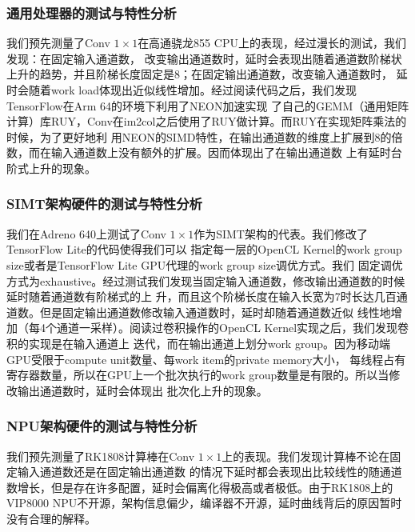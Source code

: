 \subsubsection{通用处理器的测试与特性分析}

我们预先测量了Conv $1\times 1$在高通骁龙855 CPU上的表现，经过漫长的测试，我们发现：在固定输入通道数，
改变输出通道数时，延时会表现出随着通道数阶梯状上升的趋势，并且阶梯长度固定是8；在固定输出通道数，改变输入通道数时，
延时会随着work load体现出近似线性增加。经过阅读代码之后，我们发现TensorFlow在Arm 64的环境下利用了NEON加速实现
了自己的GEMM（通用矩阵计算）库RUY，Conv在im2col之后使用了RUY做计算。而RUY在实现矩阵乘法的时候，为了更好地利
用NEON的SIMD特性，在输出通道数的维度上扩展到8的倍数，而在输入通道数上没有额外的扩展。因而体现出了在输出通道数
上有延时台阶式上升的现象。

\subsubsection{SIMT架构硬件的测试与特性分析}

我们在Adreno 640上测试了Conv $1\times 1$作为SIMT架构的代表。我们修改了TensorFlow Lite的代码使得我们可以
指定每一层的OpenCL Kernel的work group size或者是TensorFlow Lite GPU代理的work group size调优方式。我们
固定调优方式为exhaustive。经过测试我们发现当固定输入通道数，修改输出通道数的时候延时随着通道数有阶梯式的上
升，而且这个阶梯长度在输入长宽为7时长达几百通道数。但是固定输出通道数修改输入通道数时，延时却随着通道数近似
线性地增加（每4个通道一采样）。阅读过卷积操作的OpenCL Kernel实现之后，我们发现卷积的实现是在输入通道上
迭代，而在输出通道上划分work group。因为移动端GPU受限于compute unit数量、每work item的private memory大小，
每线程占有寄存器数量，所以在GPU上一个批次执行的work group数量是有限的。所以当修改输出通道数时，延时会体现出
批次化上升的现象。

\subsubsection{NPU架构硬件的测试与特性分析}

我们预先测量了RK1808计算棒在Conv $1\times 1$上的表现。我们发现计算棒不论在固定输入通道数还是在固定输出通道数
的情况下延时都会表现出比较线性的随通道数增长，但是存在许多配置，延时会偏离化得极高或者极低。由于RK1808上的
VIP8000 NPU不开源，架构信息偏少，编译器不开源，延时曲线背后的原因暂时没有合理的解释。